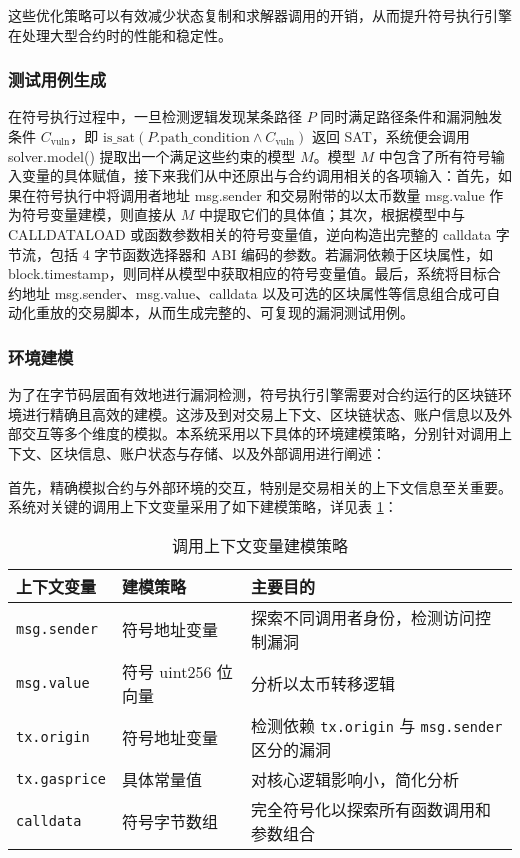 \documentclass[print, master, vlined, timesmath]{DissertUESTC}
\begin{document}
这些优化策略可以有效减少状态复制和求解器调用的开销，从而提升符号执行引擎在处理大型合约时的性能和稳定性。

\subsubsection{测试用例生成}
在符号执行过程中，一旦检测逻辑发现某条路径 \(P\) 同时满足路径条件和漏洞触发条件 \(C_{\mathrm{vuln}}\)，即 \(\mathrm{is\_sat}(P.\mathrm{path\_condition}\land C_{\mathrm{vuln}})\) 返回 SAT，系统便会调用 solver.model() 提取出一个满足这些约束的模型 \(M\)。模型 \(M\) 中包含了所有符号输入变量的具体赋值，接下来我们从中还原出与合约调用相关的各项输入：首先，如果在符号执行中将调用者地址 msg.sender 和交易附带的以太币数量 msg.value 作为符号变量建模，则直接从 \(M\) 中提取它们的具体值；其次，根据模型中与 CALLDATALOAD 或函数参数相关的符号变量值，逆向构造出完整的 calldata 字节流，包括 4 字节函数选择器和 ABI 编码的参数。若漏洞依赖于区块属性，如 block.timestamp，则同样从模型中获取相应的符号变量值。最后，系统将目标合约地址 msg.sender、msg.value、calldata 以及可选的区块属性等信息组合成可自动化重放的交易脚本，从而生成完整的、可复现的漏洞测试用例。



\subsubsection{环境建模}
为了在字节码层面有效地进行漏洞检测，符号执行引擎需要对合约运行的区块链环境进行精确且高效的建模。这涉及到对交易上下文、区块链状态、账户信息以及外部交互等多个维度的模拟。本系统采用以下具体的环境建模策略，分别针对调用上下文、区块信息、账户状态与存储、以及外部调用进行阐述：

首先，精确模拟合约与外部环境的交互，特别是交易相关的上下文信息至关重要。系统对关键的调用上下文变量采用了如下建模策略，详见表 \ref{tab:call_context_modeling}：

\begin{table}[H] %
    \centering
    \caption{调用上下文变量建模策略}
    \label{tab:call_context_modeling}
    \begin{tabular}{lll}
        \toprule
        \textbf{上下文变量} & \textbf{建模策略} & \textbf{主要目的} \\
        \midrule
        \texttt{msg.sender} & 符号地址变量 & 探索不同调用者身份，检测访问控制漏洞 \\
        \texttt{msg.value} & 符号 uint256 位向量 & 分析以太币转移逻辑 \\
        \texttt{tx.origin} & 符号地址变量  & 检测依赖 \texttt{tx.origin} 与 \texttt{msg.sender} 区分的漏洞 \\
        \texttt{tx.gasprice} & 具体常量值 & 对核心逻辑影响小，简化分析 \\
        \texttt{calldata} & 符号字节数组 & 完全符号化以探索所有函数调用和参数组合 \\
        \bottomrule
    \end{tabular}
\end{table}
\end{document}
